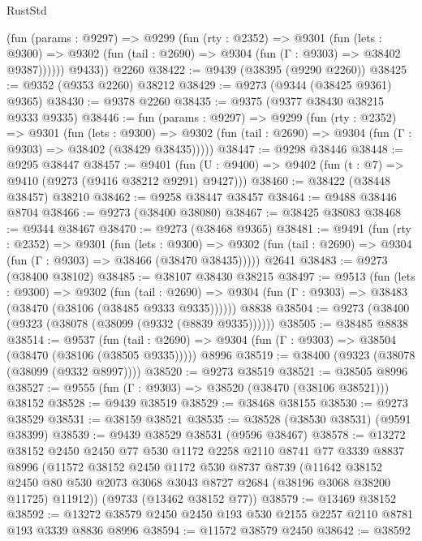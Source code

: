 \begin{lexlean}{RustStd}
\begin{coremodule}
          (fun (params : @9297) =>
          @9299
            (fun (rty : @2352) =>
            @9301
              (fun (lets : @9300) =>
              @9302 (fun (tail : @2690) => @9304 (fun (Γ : @9303) => @38402 @9387))))))
        @9433))
    @2260
@38422 := @9439 (@38395 (@9290 @2260))
@38425 := @9352 (@9353 @2260) @38212
@38429 := @9273 (@9344 (@38425 @9361) @9365)
@38430 := @9378 @2260
@38435 := @9375 (@9377 @38430 @38215 @9333 @9335)
@38446 := fun (params : @9297) =>
  @9299
    (fun (rty : @2352) =>
    @9301
      (fun (lets : @9300) =>
      @9302 (fun (tail : @2690) => @9304 (fun (Γ : @9303) => @38402 (@38429 @38435)))))
@38447 := @9298 @38446
@38448 := @9295 @38447
@38457 := @9401
    (fun (U : @9400) => @9402 (fun (t : @7) => @9410 (@9273 (@9416 @38212 @9291) @9427)))
@38460 := @38422 (@38448 @38457) @38210
@38462 := @9258 @38447 @38457
@38464 := @9488 @38446 @8704
@38466 := @9273 (@38400 @38080)
@38467 := @38425 @38083
@38468 := @9344 @38467
@38470 := @9273 (@38468 @9365)
@38481 := @9491
    (fun (rty : @2352) =>
    @9301
      (fun (lets : @9300) =>
      @9302 (fun (tail : @2690) => @9304 (fun (Γ : @9303) => @38466 (@38470 @38435)))))
    @2641
@38483 := @9273 (@38400 @38102)
@38485 := @38107 @38430 @38215
@38497 := @9513
    (fun (lets : @9300) =>
    @9302
      (fun (tail : @2690) =>
      @9304 (fun (Γ : @9303) => @38483 (@38470 (@38106 (@38485 @9333 @9335))))))
    @8838
@38504 := @9273 (@38400 (@9323 (@38078 (@38099 (@9332 (@8839 @9335))))))
@38505 := @38485 @8838
@38514 := @9537
    (fun (tail : @2690) => @9304 (fun (Γ : @9303) => @38504 (@38470 (@38106 (@38505 @9335)))))
    @8996
@38519 := @38400 (@9323 (@38078 (@38099 (@9332 @8997))))
@38520 := @9273 @38519
@38521 := @38505 @8996
@38527 := @9555 (fun (Γ : @9303) => @38520 (@38470 (@38106 @38521))) @38152
@38528 := @9439 @38519
@38529 := @38468 @38155
@38530 := @9273 @38529
@38531 := @38159 @38521
@38535 := @38528 (@38530 @38531) (@9591 @38399)
@38539 := @9439 @38529 @38531 (@9596 @38467)
@38578 := @13272
    @38152
    @2450
    @2450
    @77
    @530
    @1172
    @2258
    @2110
    @8741
    @77
    @3339
    @8837
    @8996
    (@11572
      @38152
      @2450
      @1172
      @530
      @8737
      @8739
      (@11642
        @38152
        @2450
        @80
        @530
        @2073
        @3068
        @3043
        @8727
        @2684
        (@38196 @3068 @38200 @11725)
        @11912))
    (@9733 (@13462 @38152 @77))
@38579 := @13469 @38152
@38592 := @13272 @38579 @2450 @2450 @193 @530 @2155 @2257 @2110 @8781 @193 @3339 @8836 @8996
@38594 := @11572 @38579 @2450
@38642 := @38592

\end{coremodule}
\end{lexlean}
